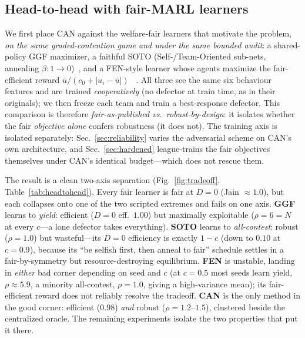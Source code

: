\documentclass[conference, a4paper]{IEEEtran}
\begin{document}
\subsection{Head-to-head with fair-MARL learners}\label{sec:headtohead}
We first place CAN against the welfare-fair learners that motivate the problem,
\emph{on the same graded-contention game and under the same bounded audit}: a
shared-policy GGF maximizer, a faithful SOTO (Self-/Team-Oriented sub-nets,
annealing $\beta{:}1{\to}0$)~\cite{zimmer2021soto}, and a FEN-style learner whose
agents maximize the fair-efficient reward $\bar u/(c_0{+}|u_i{-}\bar u|)$%
~\cite{jiang2019fen}. All three see the same six behaviour features and are trained
\emph{cooperatively} (no defector at train time, as in their originals); we then
freeze each team and train a best-response defector. This comparison is therefore
\emph{fair-as-published vs.\ robust-by-design}: it isolates whether the fair
\emph{objective alone} confers robustness (it does not). The training axis is
isolated separately: Sec.~\ref{sec:reliability} varies the adversarial scheme on
CAN's own architecture, and Sec.~\ref{sec:hardened} league-trains the fair
objectives themselves under CAN's identical budget---which does not rescue them.

The result is a clean two-axis separation (Fig.~\ref{fig:tradeoff},
Table~\ref{tab:headtohead}). Every fair learner is fair at $D{=}0$ (Jain
${\approx}1.0$), but each collapses onto one of the two scripted extremes and fails
on one axis. \textbf{GGF} learns to \emph{yield}: efficient ($D{=}0$
eff.\ $1.00$) but maximally exploitable ($\rho{=}6{=}N$ at every $c$---a lone
defector takes everything). \textbf{SOTO} learns to \emph{all-contest}: robust
($\rho{=}1.0$) but wasteful---its $D{=}0$ efficiency is exactly $1{-}c$ (down to
$0.10$ at $c{=}0.9$), because its ``be selfish first, then anneal to fair''
schedule settles in a fair-by-symmetry but resource-destroying equilibrium.
\textbf{FEN} is unstable, landing in \emph{either} bad corner depending on seed and
$c$ (at $c{=}0.5$ most seeds learn yield, $\rho{\approx}5.9$, a minority all-contest,
$\rho{=}1.0$, giving a high-variance mean); its fair-efficient reward does not
reliably resolve the tradeoff. \textbf{CAN} is the only method in the good corner:
efficient ($0.98$) \emph{and} robust ($\rho{=}1.2$--$1.5$), clustered beside the
centralized
oracle. The remaining experiments isolate the two properties that put it there.
\end{document}
